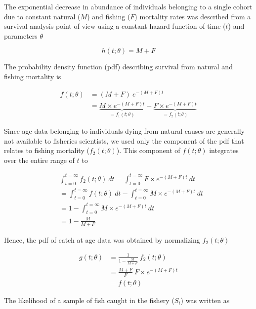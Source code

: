 The exponential decrease in abundance of individuals belonging to a single cohort due to constant natural ($M$) and fishing ($F$) mortality rates was described from a survival analysis point of view \citep{cox84b} using a constant hazard function of time ($t$) and parameters $\theta$

\begin{equation}
h(t; \theta) = M + F
\end{equation}

The probability density function (pdf) describing survival from natural and fishing mortality is

\begin{align}
f(t; \theta) & = (M + F) \ e^{-(M+F)t} \\
             & = \underbrace{M \times e^{-(M+F)t}}_{=f_{1}(t; \theta)} + \underbrace{F \times e^{-(M+F)t}}_{=f_{2}(t; \theta)}
\end{align}

Since age data belonging to individuals dying from natural causes are generally not available to fisheries scientists, we used only the component of the pdf that relates to fishing mortality ($f_{2}(t; \theta)$). This component of $f(t; \theta)$ integrates over the entire range of $t$ to 

\begin{align}
& \int_{t=0}^{t=\infty} f_{2}(t; \theta) \ dt = \int_{t=0}^{t=\infty} F \times e^{-(M+F)t} \ dt\\
                                         &= \int_{t=0}^{t=\infty} f(t; \theta) \ dt - \int_{t=0}^{t=\infty} M \times e^{-(M+F)t} \ dt\\
                                         &= 1 - \int_{t=0}^{t=\infty} M \times e^{-(M+F)t} \ dt \\
                                         &= 1 - \frac{M}{M+F}
\end{align}

Hence, the pdf of catch at age data was obtained by normalizing $f_{2}(t; \theta)$

\begin{align}
g(t; \theta) &= \frac{1}{1 - \frac{M}{M+F}} \ f_{2}(t; \theta) \\
             &= \frac{M+F}{F} \ F \times e^{-(M+F)t} \\
             &= f(t; \theta)
\end{align} 

The likelihood \citep{edwards1992likelihood} of a sample of fish caught in the fishery ($S_{i}$) was written as 

